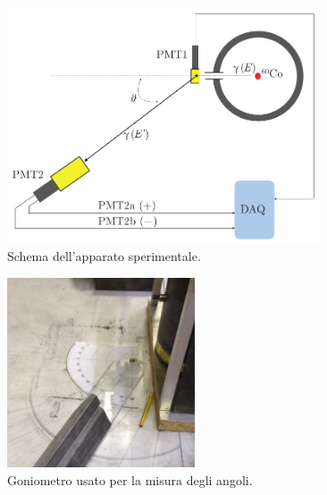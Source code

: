  \begin{figure}[h]
	\centering
	\includegraphics[width=25em]{apparato}
	\caption{\label{fig:schema_apparato}Schema dell'apparato sperimentale.}
\end{figure}
 \begin{figure}[h]
	\centering
	\includegraphics[width=15em]{goniometro}
	\caption{\label{fig:goniometro}Goniometro usato per la misura degli angoli.}
\end{figure}

